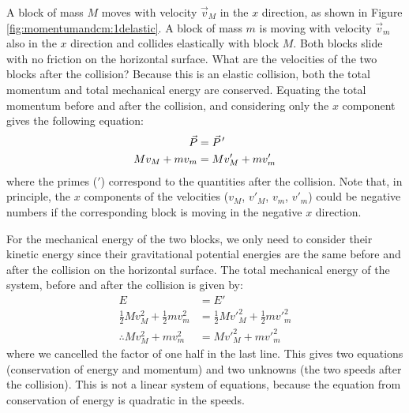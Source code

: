 \begin{example}{\label{ex:momentumandcm:1delastic}
A block of mass $M$ moves with velocity $\vec v_M$ in the $x$ direction, as shown in Figure \ref{fig:momentumandcm:1delastic}. A block of mass $m$ is moving with velocity $\vec v_m$ also in the $x$ direction and collides elastically with block $M$. Both blocks slide with no friction on the horizontal surface. What are the velocities of the two blocks after the collision?}
Because this is an elastic collision, both the total momentum and total mechanical energy are conserved. Equating the total momentum before and after the collision, and considering only the $x$ component gives the following equation:
\begin{align*}
\vec P &=\pvec P'\\
Mv_M+mv_m&=Mv'_M+mv'_m
\end{align*}
where the primes ($'$) correspond to the quantities after the collision. Note that, in principle, the $x$ components of the velocities ($v_M$, $v'_M$, $v_m$, $v'_m$) could be negative numbers if the corresponding block is moving in the negative $x$ direction.

For the mechanical energy of the two blocks, we only need to consider their kinetic energy since their gravitational potential energies are the same before and after the collision on the horizontal surface. The total mechanical energy of the system, before and after the collision is given by:
\begin{align*}
E &=E'\\
\frac{1}{2}Mv_M^2+\frac{1}{2}mv_m^2&=\frac{1}{2}Mv'^2_M+\frac{1}{2}mv'^2_m\\
\therefore Mv_M^2+mv_m^2&=Mv'^2_M+mv'^2_m
\end{align*}
where we cancelled the factor of one half in the last line. This gives two equations (conservation of energy and momentum) and two unknowns (the two speeds after the collision). This is not a linear system of equations, because the equation from conservation of energy is quadratic in the speeds.


\end{example}
